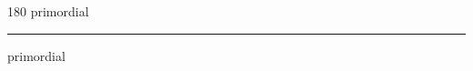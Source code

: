 
\begin{frame}
\begin{center}
\begin{turn}{180}
{\fontsize{2.5cm}{1em}\selectfont primordial}
\end{turn}
\vspace{1em}\par  
\hrule
\vspace{1em}\par  
{\fontsize{2.5cm}{1em}\selectfont primordial}
\end{center}
\end{frame}
